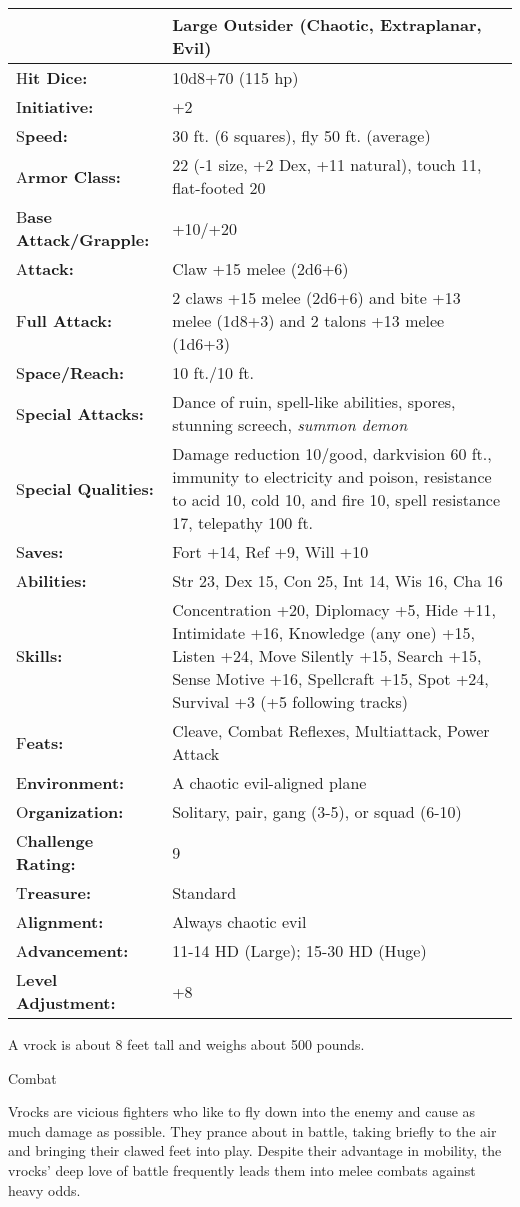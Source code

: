 \documentclass{article}
\begin{document}
\begin{tabular}{|>{\raggedright}p{91pt}|>{\raggedright}p{231pt}|}
\hline
  & Large Outsider (Chaotic, Extraplanar, Evil)\tabularnewline
\hline
H\textbf{it Dice:} & 10d8+70 (115 hp)\tabularnewline
\hline
I\textbf{nitiative:} & +2\tabularnewline
\hline
S\textbf{peed:} & 30 ft. (6 squares), fly 50 ft. (average)\tabularnewline
\hline
A\textbf{rmor Class:} & 22 (-1 size, +2 Dex, +11 natural), touch 11, flat-footed 
20\tabularnewline
\hline
B\textbf{ase Attack/Grapple:} & +10/+20\tabularnewline
\hline
A\textbf{ttack:} & Claw +15 melee (2d6+6)\tabularnewline
\hline
F\textbf{ull Attack:} & 2 claws +15 melee (2d6+6) and bite +13 melee (1d8+3) and 
2 talons +13 melee (1d6+3)\tabularnewline
\hline
S\textbf{pace/Reach:} & 10 ft./10 ft.\tabularnewline
\hline
S\textbf{pecial Attacks:} & Dance of ruin, spell-like abilities, spores, stunning 
screech, \textit{summon demon}\tabularnewline
\hline
S\textbf{pecial Qualities:} & Damage reduction 10/good, darkvision 60 ft., immunity 
to electricity and poison, resistance to acid 10, cold 10, and fire 10, spell resistance 
17, telepathy 100 ft.\tabularnewline
\hline
S\textbf{aves:} & Fort +14, Ref +9, Will +10\tabularnewline
\hline
A\textbf{bilities:} & Str 23, Dex 15, Con 25, Int 14, Wis 16, Cha 16\tabularnewline
\hline
S\textbf{kills:} & Concentration +20, Diplomacy +5, Hide +11, Intimidate +16, Knowledge 
(any one) +15, Listen +24, Move Silently +15, Search +15, Sense Motive +16, Spellcraft 
+15, Spot +24, Survival +3 (+5 following tracks)\tabularnewline
\hline
F\textbf{eats:} & Cleave, Combat Reflexes, Multiattack, Power Attack\tabularnewline
\hline
E\textbf{nvironment:} & A chaotic evil-aligned plane\tabularnewline
\hline
O\textbf{rganization:} & Solitary, pair, gang (3-5), or squad (6-10)\tabularnewline
\hline
C\textbf{hallenge Rating:} & 9\tabularnewline
\hline
T\textbf{reasure:} & Standard\tabularnewline
\hline
A\textbf{lignment:} & Always chaotic evil\tabularnewline
\hline
A\textbf{dvancement:} & 11-14 HD (Large); 15-30 HD (Huge)\tabularnewline
\hline
L\textbf{evel Adjustment:} & +8\tabularnewline
\hline
\end{tabular}

A vrock is about 8 feet tall and weighs about 500 pounds.

Combat

Vrocks are vicious fighters who like to fly down into the enemy and cause as much 
damage as possible. They prance about in battle, taking briefly to the air and 
bringing their clawed feet into play. Despite their advantage in mobility, the 
vrocks' deep love of battle frequently leads them into melee combats against heavy 
odds.
\end{document}
